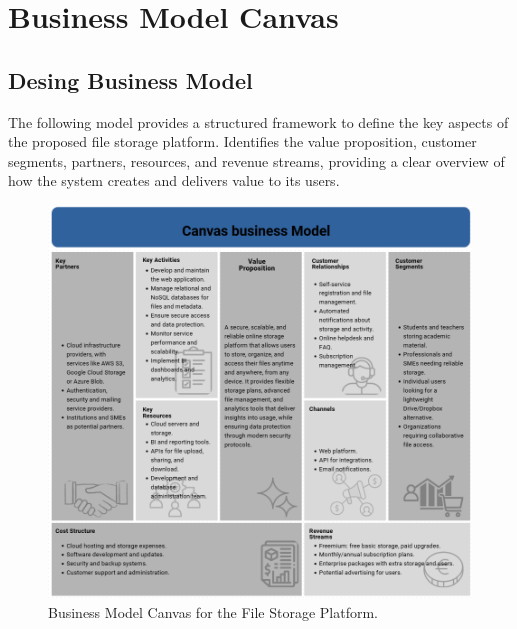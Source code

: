 \section{Business Model Canvas}
\subsection{Desing Business Model}
The following model provides a structured framework to define the key aspects of the proposed file storage platform. Identifies the value proposition, customer segments, partners, resources, and revenue streams, providing a clear overview of how the system creates and delivers value to its users. \\

\begin{figure}[H]
    \centering
    \includegraphics[width=\linewidth,height=0.95\textheight,keepaspectratio]{BusinessModel.png}
    \caption{Business Model Canvas for the File Storage Platform.}
    \label{fig:business_model}
\end{figure}
